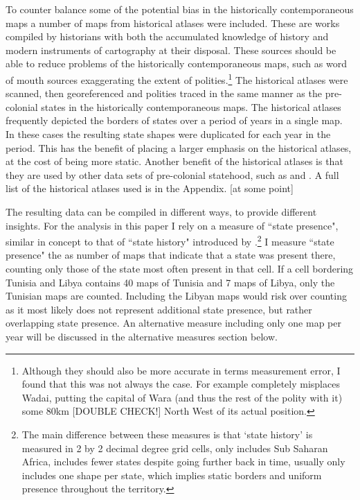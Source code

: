 \documentclass[12pt]{article}
\begin{document}

To counter balance some of the potential bias in the historically
contemporaneous maps a number of maps from historical atlases were included. These
are works compiled by historians with both the accumulated knowledge of history
and modern instruments of cartography at their disposal. These sources should be
able to reduce problems of the historically contemporaneous maps, such as word
of mouth sources exaggerating the extent of polities.\footnote{Although they should also
be more accurate in terms measurement error, I found that this was not always
the case. For example \citep{Kasule1998} completely misplaces Wadai, putting the
capital of Wara (and thus the rest of the polity with it) some 80km [DOUBLE
CHECK!] North West of its actual position.} The historical atlases were scanned,
then georeferenced and polities traced in the same manner as the pre-colonial
states in the historically contemporaneous maps. The historical atlases
frequently depicted the borders of states over a period of years in a single
map. In these cases the resulting state shapes were duplicated for each year in
the period. This has the benefit of placing a larger emphasis on the historical
atlases, at the cost of being more static. Another benefit of the historical
atlases is that they are used by other data sets of pre-colonial statehood, such
as \citet{Paine2019} and \citet{Depetris-Chauvin2016}. A full list of the
historical atlases used is in the Appendix. [at some point]

The resulting data can be compiled in different ways, to provide different
insights. For the analysis in this paper I rely on a measure of ``state
presence", similar in concept to that of ``state history" introduced by
\citet{Depetris-Chauvin2016}.\footnote{The main difference between these
	measures is that `state history' is measured in 2 by 2 decimal degree
	grid cells, only includes Sub Saharan Africa, includes fewer states
	despite going further back in time, usually only includes one shape per
state, which implies static borders and uniform presence throughout the
territory.} I measure ``state presence" the as number of maps that indicate that
a state was present there, counting only those of the state most often present
in that cell. If a cell bordering Tunisia and Libya contains 40 maps of
Tunisia and 7 maps of Libya, only the Tunisian maps are counted. Including the
Libyan maps would risk over counting as it most likely does not represent
additional state presence, but rather overlapping state presence. An alternative
measure including only one map per year will be discussed in the alternative
measures section below.
\end{document}
